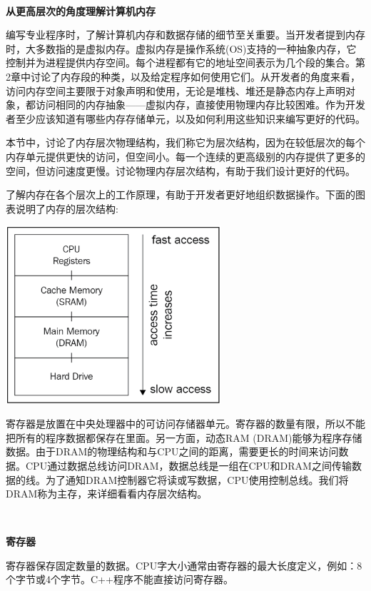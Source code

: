 \noindent\textbf{}\ \par
\textbf{从更高层次的角度理解计算机内存} \ \par

编写专业程序时，了解计算机内存和数据存储的细节至关重要。当开发者提到内存时，大多数指的是虚拟内存。虚拟内存是操作系统(OS)支持的一种抽象内存，它控制并为进程提供内存空间。每个进程都有它的地址空间表示为几个段的集合。第2章中讨论了内存段的种类，以及给定程序如何使用它们。从开发者的角度来看，访问内存空间主要限于对象声明和使用，无论是堆栈、堆还是静态内存上声明对象，都访问相同的内存抽象——虚拟内存，直接使用物理内存比较困难。作为开发者至少应该知道有哪些内存存储单元，以及如何利用这些知识来编写更好的代码。 \par
本节中，讨论了内存层次物理结构，我们称它为层次结构，因为在较低层次的每个内存单元提供更快的访问，但空间小。每一个连续的更高级别的内存提供了更多的空间，但访问速度更慢。讨论物理内存层次结构，有助于我们设计更好的代码。 \par
了解内存在各个层次上的工作原理，有助于开发者更好地组织数据操作。下面的图表说明了内存的层次结构: \par

\begin{center}
	\includegraphics[width=0.6\textwidth]{content/Section-1/Chapter-5/5}
\end{center}

寄存器是放置在中央处理器中的可访问存储器单元。寄存器的数量有限，所以不能把所有的程序数据都保存在里面。另一方面，动态RAM (DRAM)能够为程序存储数据。由于DRAM的物理结构和与CPU之间的距离，需要更长的时间来访问数据。CPU通过数据总线访问DRAM，数据总线是一组在CPU和DRAM之间传输数据的线。为了通知DRAM控制器它将读或写数据，CPU使用控制总线。我们将DRAM称为主存，来详细看看内存层次结构。 \par

\noindent\textbf{}\ \par
\textbf{寄存器} \ \par
寄存器保存固定数量的数据。CPU字大小通常由寄存器的最大长度定义，例如：8个字节或4个字节。C++程序不能直接访问寄存器。 \par

